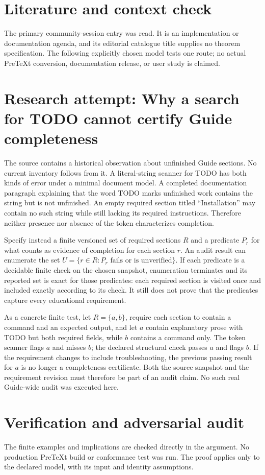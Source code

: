 \documentclass[11pt]{article}
\begin{document}
\section{Literature and context check}
The primary community-session entry was read. It is an implementation or documentation agenda, and its editorial catalogue title supplies no theorem specification. The following explicitly chosen model tests one route; no actual PreTeXt conversion, documentation release, or user study is claimed.
\section{Research attempt: Why a search for TODO cannot certify Guide completeness}
The source contains a historical observation about unfinished Guide sections. No current inventory follows from it. A literal-string scanner for TODO has both kinds of error under a minimal document model. A completed documentation paragraph explaining that the word TODO marks unfinished work contains the string but is not unfinished. An empty required section titled ``Installation'' may contain no such string while still lacking its required instructions. Therefore neither presence nor absence of the token characterizes completion.

Specify instead a finite versioned set of required sections $R$ and a predicate $P_r$ for what counts as evidence of completion for each section $r$. An audit result can enumerate the set $U=\{r\in R:P_r\text{ fails or is unverified}\}$. If each predicate is a decidable finite check on the chosen snapshot, enumeration terminates and its reported set is exact for those predicates: each required section is visited once and included exactly according to its check. It still does not prove that the predicates capture every educational requirement.

As a concrete finite test, let $R=\{a,b\}$, require each section to contain a command and an expected output, and let $a$ contain explanatory prose with TODO but both required fields, while $b$ contains a command only. The token scanner flags $a$ and misses $b$; the declared structural check passes $a$ and flags $b$. If the requirement changes to include troubleshooting, the previous passing result for $a$ is no longer a completeness certificate. Both the source snapshot and the requirement revision must therefore be part of an audit claim. No such real Guide-wide audit was executed here.
\section{Verification and adversarial audit}
The finite examples and implications are checked directly in the argument. No production PreTeXt build or conformance test was run. The proof applies only to the declared model, with its input and identity assumptions.
\end{document}
